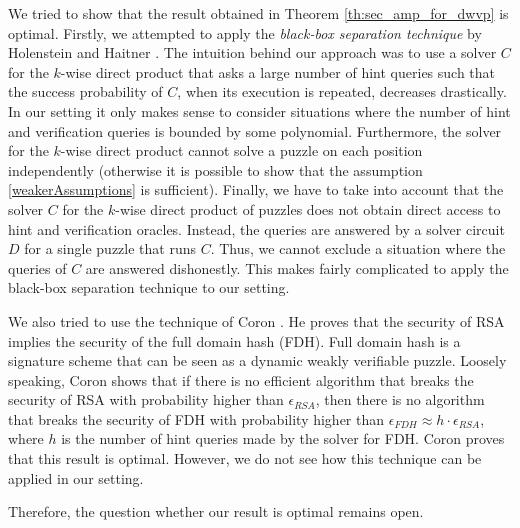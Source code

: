 We tried to show that the result obtained in Theorem \ref{th:sec_amp_for_dwvp} is optimal.
Firstly, we attempted to apply the \textit{black-box separation technique} by Holenstein and Haitner \cite{haitner2009possibility}.
The intuition behind our approach was to use a solver $C$ for the $k$-wise direct product that asks a large number of hint queries such that
the success probability of $C$, when its execution is repeated, decreases drastically.
In our setting it only makes sense to consider situations where the number of hint and verification queries is bounded by some polynomial.
Furthermore, the solver for the $k$-wise direct product cannot solve a puzzle on each position independently
(otherwise it is possible to show that the assumption \eqref{weakerAssumptions} is sufficient).
Finally, we have to take into account that the solver $C$ for the $k$-wise direct product of puzzles does not obtain direct access to hint and verification oracles.
Instead, the queries are answered by a solver circuit $D$ for a single puzzle that runs $C$. Thus, we cannot exclude a situation where the queries of $C$
are answered dishonestly. This makes fairly complicated to apply the black-box separation technique to our setting.

We also tried to use the technique of Coron \cite{coron2000exact, coron2002optimal}.
He proves that the security of RSA implies the security of the full domain hash (FDH).
Full domain hash is a signature scheme that can be seen as a dynamic weakly verifiable puzzle.
Loosely speaking, Coron shows that if there is no efficient algorithm that breaks the security of RSA with probability higher
than $\epsilon_{\mathit{RSA}}$, then there is no algorithm that breaks the security of FDH with probability higher than
$\epsilon_{\mathit{FDH}} \approx h \cdot \epsilon_{\mathit{RSA}}$, where $h$ is the number of hint queries made by the solver for FDH.
Coron proves that this result is optimal. However, we do not see how this technique can be applied in our setting.

Therefore, the question whether our result is optimal remains open.

